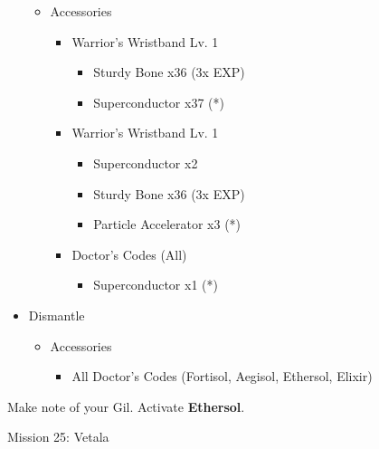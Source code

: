\begin{multicols}{2}
\begin{upgrade}
\begin{itemize}
\begin{itemize}
\begin{itemize}
                    \end{itemize}
              \item Accessories
                    \begin{itemize}
                      \item Warrior's Wristband Lv. 1
                            \begin{itemize}
                              \item Sturdy Bone x36 (3x EXP)
                              \item Superconductor x37 (*)
                            \end{itemize}
                      \item Warrior's Wristband Lv. 1
                            \begin{itemize}
                              \item Superconductor x2
                              \item Sturdy Bone x36 (3x EXP)
                              \item Particle Accelerator x3 (*)
                            \end{itemize}
                      \item Doctor's Codes (All)
                            \begin{itemize}
                              \item Superconductor x1 (*)
                            \end{itemize}
                    \end{itemize}
            \end{itemize}
      \item Dismantle
            \begin{itemize}
              \item Accessories
                    \begin{itemize}
                      \item All Doctor's Codes (Fortisol, Aegisol, Ethersol, Elixir)
                    \end{itemize}
            \end{itemize}
    \end{itemize}
  \end{upgrade}
  Make note of your Gil.
  \newpage
  Activate \textbf{Ethersol}.
  \renewcommand{\fifth}{[5] Smart Bomb (\rav/\sab/\rav)}
  \begin{battle}[0:38]{Mission 25: Vetala}
    \begin{itemize}

\end{itemize}
\end{battle}
\end{multicols}
